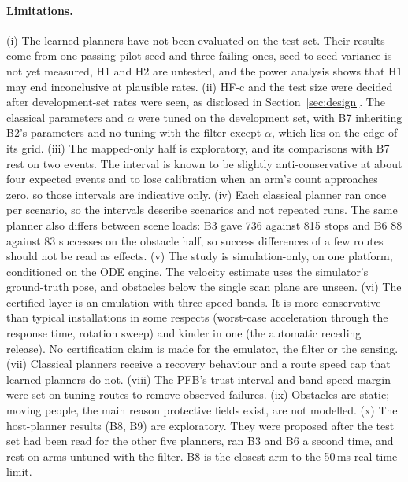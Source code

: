 \documentclass[11pt]{article}
\theoremstyle{definition}
\begin{document}
\paragraph{Limitations.} (i) The learned planners have not been evaluated on the test set. Their results come from one
passing pilot seed and three failing ones, seed-to-seed variance is not yet measured, H1 and H2 are untested, and the
power analysis shows that H1 may end inconclusive at plausible rates. (ii) HF-c and the test size were decided after
development-set rates were seen, as disclosed in Section~\ref{sec:design}. The classical parameters and $\alpha$ were
tuned on the development set, with B7 inheriting B2's parameters and no tuning with the filter except $\alpha$, which
lies on the edge of its grid. (iii) The mapped-only half is exploratory, and its comparisons with B7 rest on two
events. The interval is known to be slightly anti-conservative at about four expected events and to lose calibration
when an arm's count approaches zero, so those intervals are indicative only. (iv) Each classical planner ran once per
scenario, so the intervals describe scenarios and not repeated runs. The same planner also differs between scene loads: B3
gave 736 against 815 stops and B6 88 against 83 successes on the obstacle half, so success differences of a few routes
should not be read as effects. (v) The study is simulation-only, on one platform, conditioned on the ODE engine. The
velocity estimate uses the simulator's ground-truth pose, and obstacles below the single scan plane are unseen. (vi) The
certified layer is an emulation with three speed bands. It is more conservative than typical installations in some
respects (worst-case acceleration through the response time, rotation sweep) and kinder in one (the automatic receding
release). No certification claim is made for the emulator, the filter or the sensing. (vii) Classical planners receive a
recovery behaviour and a route speed cap that learned planners do not. (viii) The PFB's trust interval and band speed
margin were set on tuning routes to remove observed failures. (ix) Obstacles are static; moving people, the main reason
protective fields exist, are not modelled. (x) The host-planner results (B8, B9) are exploratory. They were proposed after
the test set had been read for the other five planners, ran B3 and B6 a second time, and rest on arms untuned with the
filter. B8 is the closest arm to the 50\,ms real-time limit.

\end{document}
